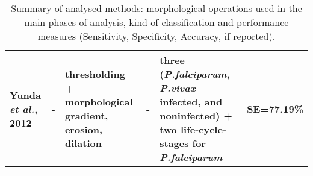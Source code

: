 \begin{longtable}{C{2.1cm} C{2.4cm} C{2.3cm} H C{2.7cm} C{2.2cm} }
	Yunda \emph{et al.}, 2012  &
	- &
	thresholding + morphological gradient, erosion, dilation  &
	- &
	three (\emph{P.falciparum}, \emph{P.vivax} infected, and noninfected) + two life-cycle-stages for \emph{P.falciparum}&
	SE=77.19\% \\
	
	\hline
	
	
	\caption{Summary of analysed methods: morphological operations used in the main phases of analysis, kind of classification and performance measures (Sensitivity, Specificity, Accuracy, if reported).} %
	\label{tab:summary_table}
\end{longtable}

